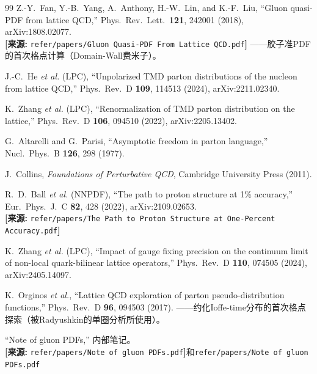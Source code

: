 \documentclass[12pt,a4paper]{ctexart}
\theoremstyle{definition}
\begin{document}
\begin{thebibliography}{99}
Z.-Y.~Fan, Y.-B.~Yang, A.~Anthony, H.-W.~Lin, and K.-F.~Liu,
``Gluon quasi-PDF from lattice QCD,''
Phys.\ Rev.\ Lett.\ \textbf{121}, 242001 (2018), arXiv:1808.02077.
\\\textbf{[来源:} \texttt{refer/papers/Gluon Quasi-PDF From Lattice QCD.pdf}\textbf{]}
——胶子准PDF的首次格点计算（Domain-Wall费米子）。

J.-C.~He \textit{et al.} (LPC), ``Unpolarized TMD parton distributions of the nucleon from lattice QCD,''
Phys.\ Rev.\ D \textbf{109}, 114513 (2024), arXiv:2211.02340.

K.~Zhang \textit{et al.} (LPC), ``Renormalization of TMD parton distribution on the lattice,''
Phys.\ Rev.\ D \textbf{106}, 094510 (2022), arXiv:2205.13402.

G.~Altarelli and G.~Parisi, ``Asymptotic freedom in parton language,''
Nucl.\ Phys.\ B \textbf{126}, 298 (1977).

J.~Collins, \textit{Foundations of Perturbative QCD}, Cambridge University Press (2011).

R.~D.~Ball \textit{et al.} (NNPDF), ``The path to proton structure at 1\% accuracy,''
Eur.\ Phys.\ J.\ C \textbf{82}, 428 (2022), arXiv:2109.02653.
\\\textbf{[来源:} \texttt{refer/papers/The Path to Proton Structure at One-Percent Accuracy.pdf}\textbf{]}

K.~Zhang \textit{et al.} (LPC), ``Impact of gauge fixing precision on the continuum limit of non-local quark-bilinear lattice operators,''
Phys.\ Rev.\ D \textbf{110}, 074505 (2024), arXiv:2405.14097.

K.~Orginos \textit{et al.}, ``Lattice QCD exploration of parton pseudo-distribution functions,''
Phys.\ Rev.\ D \textbf{96}, 094503 (2017).
——约化Ioffe-time分布的首次格点探索（被Radyushkin的单圈分析所使用）。

``Note of gluon PDFs,'' 内部笔记。
\\\textbf{[来源:} \texttt{refer/papers/Note of gluon PDFs.pdf}\textbf{]}和\texttt{refer/papers/Note of gluon PDFs.pdf}

\end{thebibliography}
\end{document}
